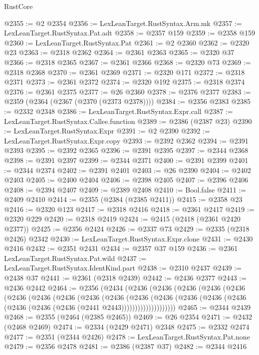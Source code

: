 \begin{lexlean}{RustCore}
\begin{coremodule}
@2355 := @2 @2354
@2356 := LexLeanTarget.RustSyntax.Arm.mk
@2357 := LexLeanTarget.RustSyntax.Pat.adt
@2358 := @2357 @159
@2359 := @2358 @159
@2360 := LexLeanTarget.RustSyntax.Pat
@2361 := @2 @2360
@2362 := @2320 @23
@2363 := @2318 @2362
@2364 := @2361 @2363
@2365 := @2320 @37
@2366 := @2318 @2365
@2367 := @2361 @2366
@2368 := @2320 @73
@2369 := @2318 @2368
@2370 := @2361 @2369
@2371 := @2320 @171
@2372 := @2318 @2371
@2373 := @2361 @2372
@2374 := @2320 @192
@2375 := @2318 @2374
@2376 := @2361 @2375
@2377 := @26 @2360
@2378 := @2376 @2377
@2383 := @2359 (@2364 (@2367 (@2370 (@2373 @2378))))
@2384 := @2356 @2383
@2385 := @2332 @2348
@2386 := LexLeanTarget.RustSyntax.Expr.call
@2387 := LexLeanTarget.RustSyntax.Callee.function
@2389 := @2386 (@2387 @23)
@2390 := LexLeanTarget.RustSyntax.Expr
@2391 := @2 @2390
@2392 := LexLeanTarget.RustSyntax.Expr.copy
@2393 := @2392 @2362
@2394 := @2391 @2393
@2395 := @2392 @2365
@2396 := @2391 @2395
@2397 := @2344 @2368
@2398 := @2391 @2397
@2399 := @2344 @2371
@2400 := @2391 @2399
@2401 := @2344 @2374
@2402 := @2391 @2401
@2403 := @26 @2390
@2404 := @2402 @2403
@2405 := @2400 @2404
@2406 := @2398 @2405
@2407 := @2396 @2406
@2408 := @2394 @2407
@2409 := @2389 @2408
@2410 := Bool.false
@2411 := @2409 @2410
@2414 := @2355 (@2384 (@2385 @2411))
@2415 := @2358 @23
@2416 := @2320 @123
@2417 := @2318 @2416
@2418 := @2361 @2417
@2419 := @2320 @229
@2420 := @2318 @2419
@2424 := @2415 (@2418 (@2361 @2420 @2377))
@2425 := @2356 @2424
@2426 := @2337 @73
@2429 := @2335 (@2318 @2426) @2342
@2430 := LexLeanTarget.RustSyntax.Expr.clone
@2431 := @2430 @2416
@2432 := @2351 @2431
@2434 := @2357 @37 @159
@2436 := @2361 LexLeanTarget.RustSyntax.Pat.wild
@2437 := LexLeanTarget.RustSyntax.IdentKind.part
@2438 := @2310 @2437
@2439 := @2438 @37
@2441 := @2361 (@2318 @2439)
@2442 := @2436 @2377
@2443 := @2436 @2442
@2464 := @2356
    (@2434
      (@2436
        (@2436
          (@2436
            (@2436
              (@2436
                (@2436
                  (@2436
                    (@2436
                      (@2436
                        (@2436
                          (@2436
                            (@2436
                              (@2436
                                (@2436 (@2436 (@2436 (@2436 (@2436 (@2441 @2443))))))))))))))))))))
@2465 := @2344 @2439
@2468 := @2355 (@2464 (@2385 @2465))
@2469 := @26 @2354
@2471 := @2432 (@2468 @2469)
@2474 := @2334 (@2429 @2471) @2348
@2475 := @2332 @2474
@2477 := @2351 (@2344 @2426)
@2478 := LexLeanTarget.RustSyntax.Pat.none
@2479 := @2356 @2478
@2481 := @2386 (@2387 @37)
@2482 := @2344 @2416

\end{coremodule}
\end{lexlean}
